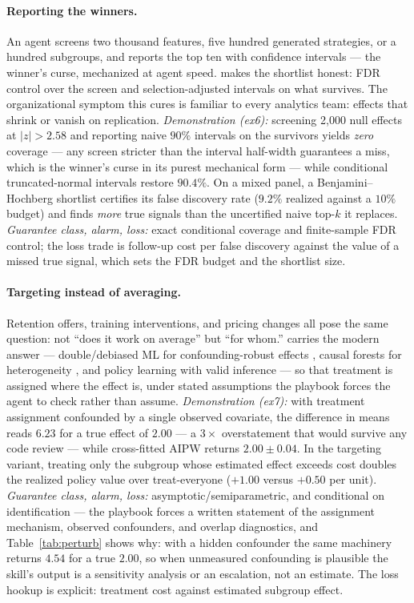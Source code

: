 \documentclass[11pt,a4paper]{article}
\begin{document}
\paragraph{Reporting the winners.} An agent screens two thousand features,
five hundred generated strategies, or a hundred subgroups, and reports the
top ten with confidence intervals --- the winner's curse, mechanized at
agent speed.  makes the shortlist honest:
FDR control over the screen \citep{bh1995,barber2015,candes2018} and
selection-adjusted intervals on what survives. The organizational symptom
this cures is familiar to every analytics team: effects that shrink or
vanish on replication. \emph{Demonstration (ex6):} screening 2{,}000 null
effects at $|z|>2.58$ and reporting naive $90\%$ intervals on the survivors
yields \emph{zero} coverage --- any screen stricter than the interval
half-width guarantees a miss, which is the winner's curse in its purest
mechanical form --- while conditional truncated-normal intervals restore
$90.4\%$. On a mixed panel, a Benjamini--Hochberg shortlist certifies its
false discovery rate ($9.2\%$ realized against a $10\%$ budget) and finds
\emph{more} true signals than the uncertified naive top-$k$ it replaces.
\emph{Guarantee class, alarm, loss:} exact conditional coverage and
finite-sample FDR control; the loss trade is follow-up cost per false
discovery against the value of a missed true signal, which sets the FDR
budget and the shortlist size.

\paragraph{Targeting instead of averaging.} Retention offers, training
interventions, and pricing changes all pose the same question: not ``does
it work on average'' but ``for whom.''  carries the
modern answer --- double/debiased ML for confounding-robust effects
\citep{chernozhukov2018}, causal forests for heterogeneity
\citep{wager2018}, and policy learning with valid inference
\citep{athey2021} --- so that treatment is assigned where the effect is,
under stated assumptions the playbook forces the agent to check rather than
assume. \emph{Demonstration (ex7):} with treatment assignment confounded by
a single observed covariate, the difference in means reads $6.23$ for a
true effect of $2.00$ --- a $3\times$ overstatement that would survive any
code review --- while cross-fitted AIPW returns $2.00\pm0.04$. In the
targeting variant, treating only the subgroup whose estimated effect
exceeds cost doubles the realized policy value over treat-everyone
($+1.00$ versus $+0.50$ per unit). \emph{Guarantee class, alarm, loss:}
asymptotic/semiparametric, and conditional on identification --- the
playbook forces a written statement of the assignment mechanism, observed
confounders, and overlap diagnostics, and Table~\ref{tab:perturb} shows
why: with a hidden confounder the same machinery returns $4.54$ for a true
$2.00$, so when unmeasured confounding is plausible the skill's output is
a sensitivity analysis or an escalation, not an estimate. The loss hookup
is explicit: treatment cost against estimated subgroup effect.
\end{document}
